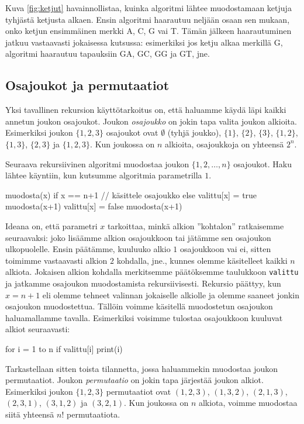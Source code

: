 Kuva \ref{fig:ketjut} havainnollistaa,
kuinka algoritmi lähtee muodostamaan ketjuja tyhjästä ketjusta alkaen.
Ensin algoritmi haarautuu neljään osaan sen mukaan,
onko ketjun ensimmäinen merkki A, C, G vai T.
Tämän jälkeen haarautuminen jatkuu vastaavasti
jokaisessa kutsussa:
esimerkiksi jos ketju alkaa merkillä G,
algoritmi haarautuu tapauksiin GA, GC, GG ja GT, jne.

\subsection{Osajoukot ja permutaatiot}

Yksi tavallinen rekursion käyttötarkoitus on,
että haluamme käydä läpi kaikki annetun joukon osajoukot.
Joukon \emph{osajoukko} on jokin tapa valita joukon alkioita.
Esimerkiksi joukon $\{1,2,3\}$ osajoukot ovat
$\emptyset$ (tyhjä joukko), $\{1\}$, $\{2\}$, $\{3\}$,
$\{1,2\}$, $\{1,3\}$, $\{2,3\}$ ja $\{1,2,3\}$.
Kun joukossa on $n$ alkioita, osa\-joukkoja on yhteensä $2^n$.

Seuraava rekursiivinen algoritmi muodostaa joukon
$\{1,2,\dots,n\}$ osajoukot.
Haku lähtee käyntiin, kun kutsumme algoritmia
parametrilla $1$.

\begin{code}
muodosta(x)
    if x == n+1
        // käsittele osajoukko
    else
        valittu[x] = true
        muodosta(x+1)
        valittu[x] = false
        muodosta(x+1)
\end{code}

Ideana on, että parametri $x$ tarkoittaa, minkä alkion
''kohtalon'' ratkaisemme seuraavaksi: joko lisäämme alkion
osajoukkoon tai jätämme sen osa\-joukon ulkopuolelle.
Ensin päätämme, kuuluuko alkio $1$ osajoukkoon vai ei,
sitten toimimme vastaavasti alkion $2$ kohdalla, jne.,
kunnes olemme käsitelleet kaikki $n$ alkiota.
Jokaisen alkion kohdalla merkitsemme päätöksemme taulukkoon
\texttt{valittu} ja jatkamme osajoukon muodostamista rekursiivisesti.
Rekursio päät\-tyy, kun $x=n+1$ eli olemme tehneet valinnan
jokaiselle alkiolle ja olemme saaneet jonkin osajoukon muodostettua.
Tällöin voimme käsitellä muodostetun osajoukon haluamallamme tavalla.
Esimerkiksi voisimme tulostaa osajoukkoon kuuluvat alkiot seuraavasti:

\begin{code}
for i = 1 to n
    if valittu[i]
        print(i)
\end{code}

Tarkastellaan sitten toista tilannetta, jossa haluammekin
muodostaa joukon permutaatiot.
Joukon \emph{permutaatio} on jokin tapa järjestää joukon alkiot.
Esimerkiksi joukon $\{1,2,3\}$ permutaatiot ovat
$(1,2,3)$, $(1,3,2)$, $(2,1,3)$, $(2,3,1)$, $(3,1,2)$ ja $(3,2,1)$.
Kun joukossa on $n$ alkiota, voimme muodostaa siitä yhteensä $n!$ permutaatiota.

